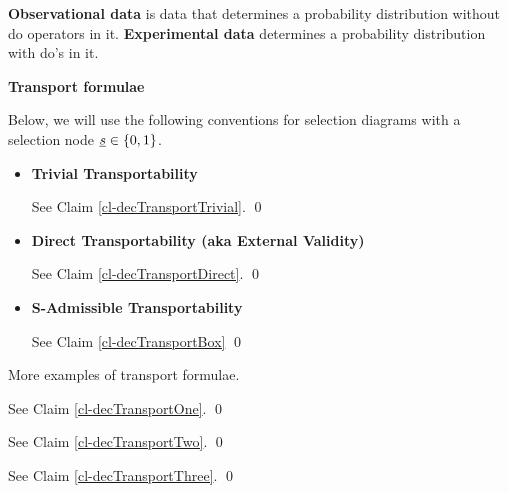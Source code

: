 {\bf Observational data} is data that
determines a probability distribution
without do operators in it.
 {\bf Experimental data} 
determines a probability distribution
 with do's in it.




{\bf Transport formulae}

Below, we will
use the following conventions
for selection diagrams
with a selection node ${\underline{s}}\in\{0,1\}$.
\selectionGraphs

\begin{itemize}
\item {\bf Trivial Transportability}

\begin{claim}
\decTransportTrivial
\end{claim}
\proof
See Claim \ref{cl-decTransportTrivial}.
\qed

\item{\bf Direct Transportability 
(aka External Validity)}

\begin{claim}
\decTransportDirect
\end{claim}
\proof
See Claim \ref{cl-decTransportDirect}.
\qed



\item {\bf S-Admissible Transportability}


\begin{claim}
\decTransportBox
\end{claim}
\proof
See Claim \ref{cl-decTransportBox}
\qed

\end{itemize}

More examples of transport formulae.

\begin{claim}
\decTransportOne
\end{claim}
\proof
See Claim \ref{cl-decTransportOne}.
\qed

\begin{claim}
\decTransportTwo
\end{claim}
\proof
See Claim \ref{cl-decTransportTwo}.
\qed

\begin{claim}
\decTransportThree
\end{claim}
\proof
See Claim \ref{cl-decTransportThree}.
\qed